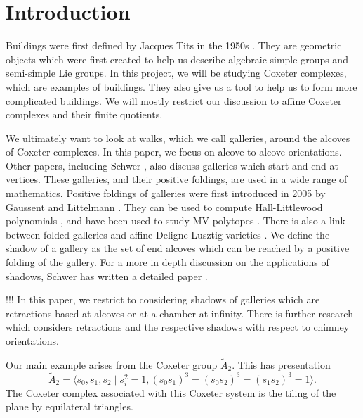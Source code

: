 \documentclass[11pt]{article}
\begin{document}
\section{Introduction}
Buildings were first defined by Jacques Tits in the 1950s \cite{TITS}. They are geometric objects which were first created to help us describe algebraic simple groups and semi-simple Lie groups. In this project, we will be studying Coxeter complexes, which are examples of buildings. They also give us a tool to help us to form more complicated buildings. We will mostly restrict our discussion to affine Coxeter complexes and their finite quotients.

We ultimately want to look at walks, which we call galleries, around the alcoves of Coxeter complexes. In this paper, we focus on alcove to alcove orientations. Other papers, including Schwer \cite{WILD}, also discuss galleries which start and end at vertices. These galleries, and their positive foldings, are used in a wide range of mathematics. Positive foldings of galleries were first introduced in 2005 by Gaussent and Littelmann \cite{LSGAL}. They can be used to compute Hall-Littlewood polynomials \cite{HL}, and have been used to study MV polytopes \cite{MVPOLY}. There is also a link between folded galleries and affine Deligne-Lusztig varieties \cite{DEL}. We define the shadow of a gallery as the set of end alcoves which can be reached by a positive folding of the gallery. For a more in depth discussion on the applications of shadows, Schwer has written a detailed paper \cite{WILD}.

!!! In this paper, we restrict to considering shadows of galleries which are retractions based at alcoves or at a chamber at infinity. There is further research \cite{NAQVI} which considers retractions and the respective shadows with respect to chimney orientations.

 

Our main example arises from the Coxeter group $\tilde{A}_2$. This has presentation
\[\tilde{A}_2=\langle s_0,s_1,s_2\mid s_i^2=1, (s_0s_1)^3=(s_0s_2)^3=(s_1s_2)^3=1\rangle.\]
The Coxeter complex associated with this Coxeter system is the tiling of the plane by equilateral triangles. 
\end{document}
